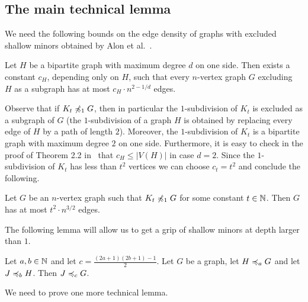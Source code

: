\subsection{The main technical lemma}

We need the following bounds on the edge density
of graphs with excluded shallow minors obtained
by Alon et al.~\cite{alon2003turan}. 

\begin{lemma}\label{lem:densitynd}
Let $H$ be a bipartite graph with maximum degree
$d$ on one side. Then exists a constant $c_H$, depending 
only on $H$, such that every $n$-vertex graph $G$
excluding~$H$ as a subgraph has at most $c_H\cdot n^{2-1/d}$
edges. 
\end{lemma} 

Observe that if $K_t\not\preccurlyeq_1G$, then in particular
the $1$-subdivision of $K_t$ is excluded as a subgraph
of $G$ (the $1$-subdivision of a graph $H$ is obtained by 
replacing every edge of $H$ by a path of length $2$). 
Moreover, the $1$-subdivision of 
$K_t$ is a bipartite graph with maximum degree $2$ on one
side. Furthermore, it is easy to check in the 
proof of Theorem 2.2 in~\cite{alon2003turan} 
that $c_H\leq |V(H)|$
in case $d=2$. Since the $1$-subdivision of $K_t$ has 
less than $t^2$ vertices we can choose $c_t=t^2$ and
conclude the following.   

\begin{corollary}\label{crl:densitynd}
Let $G$ be an $n$-vertex graph such that $K_t\not\preccurlyeq_1 G$ for
some constant $t\in \mathbb{N}$. Then $G$ has at most 
$t^2\cdot n^{3/2}$ edges.
\end{corollary}

The following lemma will allow us to get a grip of 
shallow minors at depth larger than $1$.

\begin{lemma}\label{lem:combineminors}
Let $a,b\in \mathbb{N}$ and let $c=\frac{(2a+1)(2b+1)-1}{2}$. 
Let $G$ be a graph, let $H\preccurlyeq_aG$ and let 
$J\preccurlyeq_bH$. Then $J\preccurlyeq_cG$. 
\end{lemma}

We need to prove one more technical lemma. 

